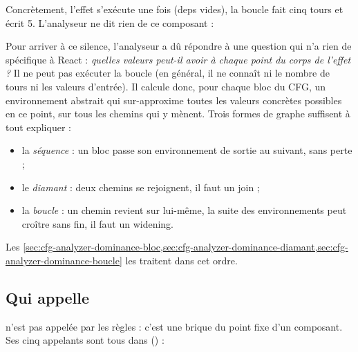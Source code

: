 Concrètement, l'effet s'exécute une fois (deps vides), la boucle fait cinq tours
et  écrit 5. L'analyseur ne dit rien de ce composant :


Pour arriver à ce silence, l'analyseur a dû répondre à une question qui n'a
rien de spécifique à React : \emph{quelles valeurs  peut-il avoir à
chaque point du corps de l'effet ?} Il ne peut pas exécuter la boucle (en
général, il ne connaît ni le nombre de tours ni les valeurs d'entrée). Il
calcule donc, pour chaque bloc du CFG, un environnement abstrait qui
sur-approxime toutes les valeurs concrètes possibles en ce point, sur tous les
chemins qui y mènent. Trois formes de graphe suffisent à tout expliquer :
\begin{itemize}
  \item la \emph{séquence} : un bloc passe son environnement de sortie au
    suivant, sans perte ;
  \item le \emph{diamant} : deux chemins se rejoignent, il faut un join ;
  \item la \emph{boucle} : un chemin revient sur lui-même, la suite des
    environnements peut croître sans fin, il faut un widening.
\end{itemize}
Les \cref{sec:cfg-analyzer-dominance-bloc,sec:cfg-analyzer-dominance-diamant,sec:cfg-analyzer-dominance-boucle}
les traitent dans cet ordre.

\subsection{Qui appelle }

 n'est pas appelée par les règles : c'est une brique du
point fixe d'un composant. Ses cinq appelants sont tous dans
 () :

